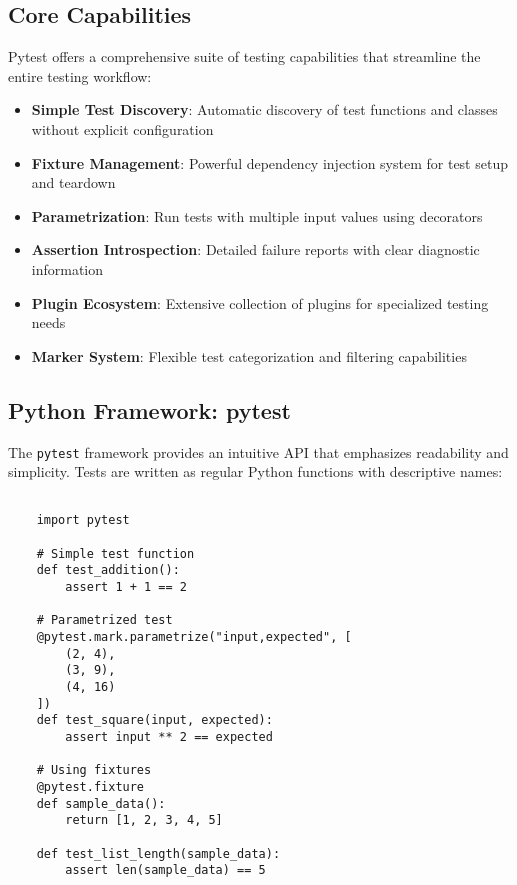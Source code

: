 \subsection{Core Capabilities}
\label{subsec:capabilities}

Pytest offers a comprehensive suite of testing capabilities that streamline the entire testing workflow:

\begin{itemize}
	\item \textbf{Simple Test Discovery}: Automatic discovery of test functions and classes without explicit configuration
	\item \textbf{Fixture Management}: Powerful dependency injection system for test setup and teardown
	\item \textbf{Parametrization}: Run tests with multiple input values using decorators
	\item \textbf{Assertion Introspection}: Detailed failure reports with clear diagnostic information
	\item \textbf{Plugin Ecosystem}: Extensive collection of plugins for specialized testing needs
	\item \textbf{Marker System}: Flexible test categorization and filtering capabilities
\end{itemize}

\clearpage

\subsection{Python Framework: pytest}
\label{subsec:pytest}

The \texttt{pytest} framework provides an intuitive API that emphasizes readability and simplicity. Tests are written as regular Python functions with descriptive names:

\begin{lstlisting}[language=MyPython, caption={Pytest Core Concepts}, label={lst:pytest_core}]
	
	import pytest
	
	# Simple test function
	def test_addition():
	    assert 1 + 1 == 2
	
	# Parametrized test
	@pytest.mark.parametrize("input,expected", [
	    (2, 4),
	    (3, 9),
	    (4, 16)
	])
	def test_square(input, expected):
	    assert input ** 2 == expected
	
	# Using fixtures
	@pytest.fixture
	def sample_data():
	    return [1, 2, 3, 4, 5]
	
	def test_list_length(sample_data):
	    assert len(sample_data) == 5
	
\end{lstlisting}

